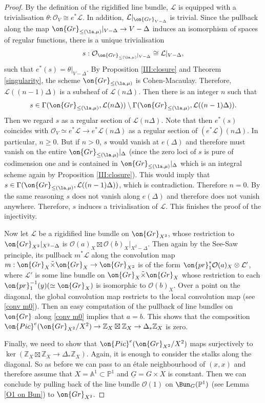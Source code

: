 \documentclass[]{pcmi}
\theoremstyle{plain}
\theoremstyle{remark}
\theoremstyle{definition}
\newcommand{\bA}{{\mathbb A}}
\newcommand{\bP}{{\mathbb P}}
\newcommand{\bZ}{{\mathbb Z}}
\newcommand{\mL}{{\mathcal L}}
\newcommand{\mO}{{\mathcal O}}
\newcommand{\Gr}{{\on{Gr}}}
\newcommand{\Pic}{{\on{Pic}}}
\newcommand{\pr}{{\on{pr}}}
\begin{document}
\begin{proof}
By the definition of the rigidified line bundle, $\mL$ is equipped with a trivialisation $\theta: \mO_{V}\cong e^*\mL$. In addition, $\mL|_{\Gr_{V-\Delta}}$ is trivial. Since the pullback along  the map $\Gr_{\leq(\la,\mu)}|_{V-\Delta}\to V-\Delta$ induces an isomorphism of spaces of regular functions, there is a unique trivialisation 
$$s:  \mO_{\Gr_{\leq(\la,\mu)}|_{V-\Delta}}\cong \mL|_{V-\Delta},$$ 
such that $e^*(s)=\theta|_{V-\Delta}$. By Proposition \ref{III:closure} and  Theorem \ref{singularity}, the scheme $\Gr_{\leq(\la,\mu)}$ is Cohen-Macaulay. Therefore, $\mL((n-1)\Delta)$ is a subsheaf of $\mL(n\Delta)$. Then
there is an integer $n$ such that 
$$s\in \Gamma(\Gr_{\leq(\la,\mu)},\mL(n\Delta))\setminus \Gamma(\Gr_{\leq(\la,\mu)},\mL((n-1)\Delta)).$$ Then we regard $s$ as a regular section of $\mL(n\Delta)$. 
Note that then $e^*(s)$ coincides with $\mO_V\simeq e^*\mL\to e^*\mL(n\Delta)$ as a regular section of $(e^*\mL)(n\Delta)$. In particular, $n\geq 0$. But if $n>0$, $s$ would vanish at $e(\Delta)$ and therefore must vanish on the entire $\Gr_{\leq (\la,\mu)}|_\Delta$ (since the zero loci of $s$ is pure of codimension one and is contained in $\Gr_{\leq (\la,\mu)}|_\Delta$ which is an integral scheme again by Proposition \ref{III:closure}). This would imply that $s\in \Gamma(\Gr_{\leq(\la,\mu)},\mL((n-1)\Delta))$, which is contradiction. Therefore $n=0$. By the same reasoning $s$ does not vanish along $e(\Delta)$ and therefore does not vanish anywhere. Therefore, $s$ induces a trivialisation of $\mL$. This finishes the proof of the injectivity.

Now let $\mL$ be a rigidified line bundle on $\Gr_{X^2}$, whose restriction to $\Gr_{X^2}|_{X^2-\Delta}$ is $\mO(a)_X\boxtimes\mO(b)_X|_{X^2-\Delta}$. Then again by the See-Saw principle,  its pullback $m^*\mL$ along the convolution map $m: \Gr_X\tilde\times\Gr_X\to \Gr_{X^2}$ is of the form $\pr_1^*\mO(a)_X\otimes \mL'$, where $\mL'$ is some line bundle on $\Gr_X\tilde\times\Gr_X$ whose restriction to each $\pr_1^{-1}(y)(\simeq \Gr_X)$ is isomorphic to $\mO(b)_X$. Over a point on the diagonal, the global convolution map restricts to the local convolution map (see \eqref{conv m0}). Then an easy computation of the pullback of line bundles on $\Gr$ along \eqref{conv m0} implies that $a=b$. This shows that the composition $\Pic^e(\Gr_{X^2}/X^2)\to \bZ_X\boxtimes\bZ_X\to \Delta_*\bZ_X$ is zero. 


Finally, we need to show that $\Pic^e(\Gr_{X^2}/X^2)$ maps surjectively to $\ker(\bZ_X\boxtimes\bZ_X\to\Delta_*\bZ_X)$. Again, it is enough to consider the stalks along the diagonal. So as before we can pass to an \'etale neighbourhood of $(x,x)$ and therefore assume that $X=\bA^1\subset \bP^1$ and $\underline G=G\times X$ is constant. Then we can conclude by pulling back of the line bundle $\mO(1)$ on $\Bun_G(\bP^1)$ (see Lemma \ref{O1 on Bun}) to $\Gr_{X^2}$. 
\end{proof}
\end{document}
